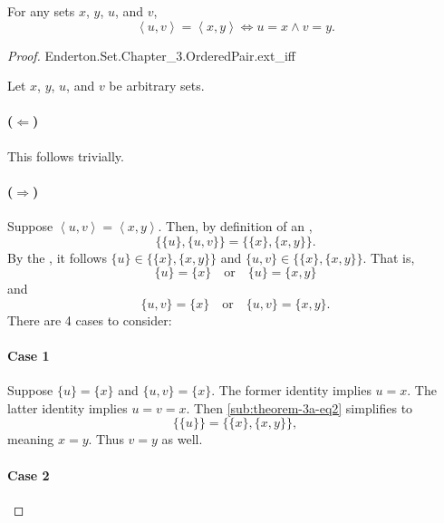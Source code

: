 \documentclass{report}
\begin{document}
\begin{theorem}[3A]

  For any sets $x$, $y$, $u$, and $v$,
    \begin{equation}
      \label{sub:theorem-3a-eq1}
      \left< u, v \right> = \left< x, y \right> \iff u = x \land v = y.
    \end{equation}

\end{theorem}

\begin{proof}

    {Enderton.Set.Chapter\_3.OrderedPair.ext\_iff}

  Let $x$, $y$, $u$, and $v$ be arbitrary sets.

  \paragraph{($\Leftarrow$)}%

    This follows trivially.

  \paragraph{($\Rightarrow$)}%

    Suppose $\left< u, v \right> = \left< x, y \right>$.
    Then, by definition of an ,
      \begin{equation}
        \label{sub:theorem-3a-eq2}
        \{\{u\}, \{u, v\}\} = \{\{x\}, \{x, y\}\}.
      \end{equation}
    By the , it follows
      $\{u\} \in \{\{x\}, \{x, y\}\}$ and
      $\{u, v\} \in \{\{x\}, \{x, y\}\}$.
    That is,
      $$\{u\} = \{x\} \quad\text{or}\quad \{u\} = \{x, y\}$$
      and
      $$\{u, v\} = \{x\} \quad\text{or}\quad \{u, v\} = \{x, y\}.$$
    There are 4 cases to consider:

    \paragraph{Case 1}%

      Suppose $\{u\} = \{x\}$ and $\{u, v\} = \{x\}$.
      The former identity implies $u = x$.
      The latter identity implies $u = v = x$.
      Then \eqref{sub:theorem-3a-eq2} simplifies to
        $$\{\{u\}\} = \{\{x\}, \{x, y\}\},$$ meaning $x = y$.
      Thus $v = y$ as well.

    \paragraph{Case 2}%


\end{proof}
\end{document}
